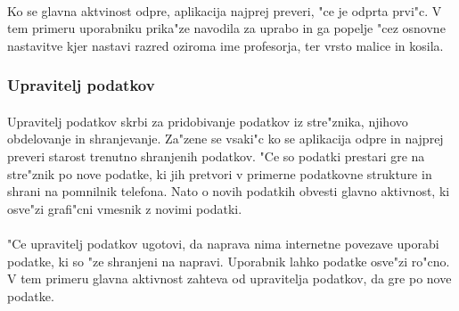 \paragraph{}Ko se glavna aktvinost odpre, aplikacija najprej preveri, "ce je odprta prvi"c. V tem primeru uporabniku prika"ze navodila za uprabo in ga popelje "cez osnovne nastavitve kjer nastavi razred oziroma ime profesorja, ter vrsto malice in kosila.

\subsubsection{Upravitelj podatkov}
\paragraph{}Upravitelj podatkov skrbi za pridobivanje podatkov iz stre"znika, njihovo obdelovanje in shranjevanje. Za"zene se vsaki"c ko se aplikacija odpre in najprej preveri starost trenutno shranjenih podatkov. "Ce so podatki prestari gre na stre"znik po nove podatke, ki jih pretvori v primerne podatkovne strukture in shrani na pomnilnik telefona. Nato o novih podatkih obvesti glavno aktivnost, ki osve"zi grafi"cni vmesnik z novimi podatki.

\paragraph{}"Ce upravitelj podatkov ugotovi, da naprava nima internetne povezave uporabi podatke, ki so "ze shranjeni na napravi. Uporabnik lahko podatke osve"zi ro"cno. V tem primeru glavna aktivnost zahteva od upravitelja podatkov, da gre po nove podatke.

